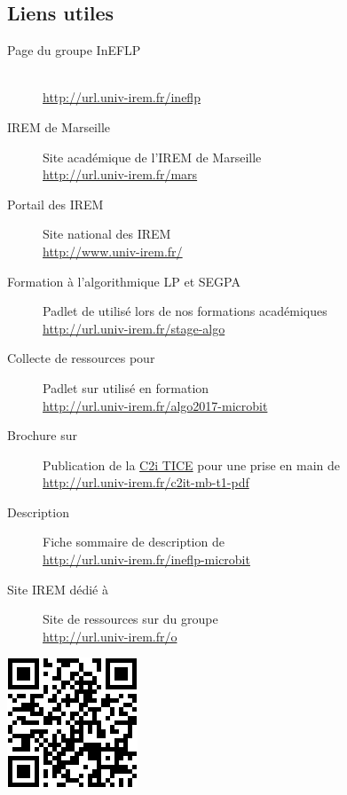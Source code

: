 \subsection{Liens utiles}
\begin{description}
    \item[Page du groupe InEFLP]  ~\\
        \url{http://url.univ-irem.fr/ineflp}
    \item[IREM de Marseille] Site académique de l'IREM de Marseille\\
        \url{http://url.univ-irem.fr/mars}
    \item[Portail des IREM] Site national des IREM\\
        \url{http://www.univ-irem.fr/}
    \item[Formation à l'algorithmique LP et SEGPA]
        Padlet de utilisé lors de nos formations académiques\\
        \url{http://url.univ-irem.fr/stage-algo}
    \item[Collecte de ressources pour \mb]
        Padlet sur \mb utilisé en formation\\
        \url{http://url.univ-irem.fr/algo2017-microbit}
    \item[Brochure sur \mb]
        Publication de la \href{http://www.univ-irem.fr/spip.php?rubrique18}{C2i TICE} pour une prise en main de \mb\\
        \url{http://url.univ-irem.fr/c2it-mb-t1-pdf}
    \item[Description \mb] Fiche sommaire de description de \mb\\
        \url{http://url.univ-irem.fr/ineflp-microbit}
    \item[Site IREM dédié à \mb] Site de ressources sur \mb du groupe\\
        \url{http://url.univ-irem.fr/o}
\end{description}


\begin{center}
    \href{http://url.univ-irem.fr/ineflp}
    {\includegraphics[width=0.1\linewidth]{res/fig-ineflp-qr.png}}
\end{center}

